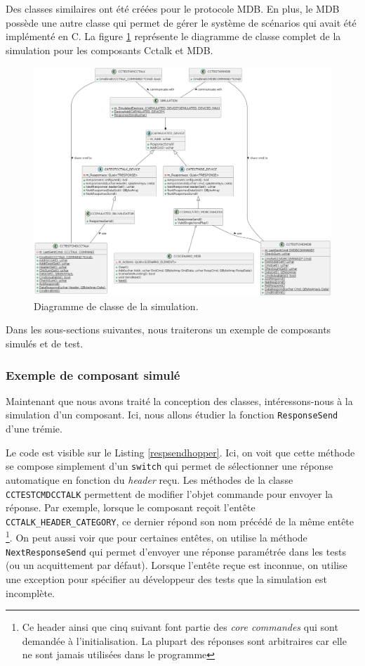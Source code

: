 \documentclass[a4paper]{article}
\begin{document}
Des classes similaires ont été créées pour le protocole MDB. En plus, le MDB
possède une autre classe qui permet de gérer le système de scénarios qui avait
été implémenté en C. La figure \ref{fig:simcomplete} représente le diagramme de
classe complet de la simulation pour les composants Cctalk et MDB.

\pagebreak
\begin{figure}[h!]
  \begin{center}
  \includegraphics[scale=0.3]{./graphs/simulation.png}
    \caption{Diagramme de classe de la simulation.}
    \label{fig:simcomplete}
  \end{center}
\end{figure}

Dans les sous-sections suivantes, nous traiterons un exemple de composants
simulés et de test.

\subsubsection{Exemple de composant simulé}

Maintenant que nous avons traité la conception des classes, intéressons-nous à
la simulation d'un composant. Ici, nous allons étudier la fonction
\verb|ResponseSend| d'une trémie.

Le code est visible sur le Listing \ref{respsendhopper}. Ici, on voit que
cette méthode se compose simplement d'un \verb|switch| qui permet de
sélectionner une réponse automatique en fonction du \textit{header} reçu. Les
méthodes de la classe \verb|CCTESTCMDCCTALK| permettent de modifier l'objet
commande pour envoyer la réponse. Par exemple, lorsque le composant reçoit
l'entête \verb|CCTALK_HEADER_CATEGORY|, ce dernier répond son nom précédé de la
même entête \footnote{Ce header ainsi que cinq suivant font partie des
\textit{core commandes} qui sont demandée à l'initialisation. La plupart des
réponses sont arbitraires car elle ne sont jamais utilisées dans le programme}.
On peut aussi voir que pour certaines entêtes, on utilise la méthode
\verb|NextResponseSend| qui permet d'envoyer une réponse paramétrée dans les
tests (ou un acquittement par défaut). Lorsque l'entête reçue est inconnue, on
utilise une exception pour spécifier au développeur des tests que la simulation
est incomplète.
\end{document}
